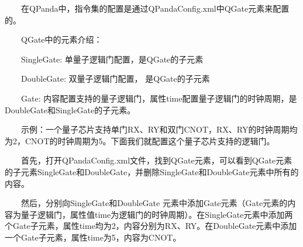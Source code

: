 \documentclass[a4paper,11pt,english]{sphinxmanual}
\begin{document}
\sphinxAtStartPar
  在QPanda中，指令集的配置是通过QPandaConfig.xml中QGate元素来配置的。

\sphinxAtStartPar
  QGate中的元素介绍：

\sphinxAtStartPar
  SingleGate: 单量子逻辑门配置，是QGate的子元素

\sphinxAtStartPar
  DoubleGate: 双量子逻辑门配置， 是QGate的子元素

\sphinxAtStartPar
  Gate: 内容配置支持的量子逻辑门，属性time配置量子逻辑门的时钟周期，是DoubleGate和SingleGate的子元素。

\sphinxAtStartPar
  示例：一个量子芯片支持单门RX、RY和双门CNOT，RX、RY的时钟周期均为2，CNOT的时钟周期为5。下面我们就配置这个量子芯片支持的逻辑门。

\sphinxAtStartPar
  首先，打开QPandaConfig.xml文件，找到QGate元素，可以看到QGate元素的子元素SingleGate和DoubleGate，并删除SingleGate和DoubleGate元素中所有的内容。

\begin{sphinxVerbatim}[commandchars=\\\{\}]
        
        
        
 
\end{sphinxVerbatim}

\sphinxAtStartPar
  然后，分别向SingleGate和DoubleGate 元素中添加Gate元素（Gate元素的内容为量子逻辑门，属性值time为逻辑门的时钟周期）。在SingleGate元素中添加两个Gate子元素，属性time均为2，内容分别为RX、RY。在DoubleGate元素中添加一个Gate子元素，属性time为5，内容为CNOT。

\begin{sphinxVerbatim}[commandchars=\\\{\}]
        
           
               
        
               
        
 
\end{sphinxVerbatim}
\end{document}
